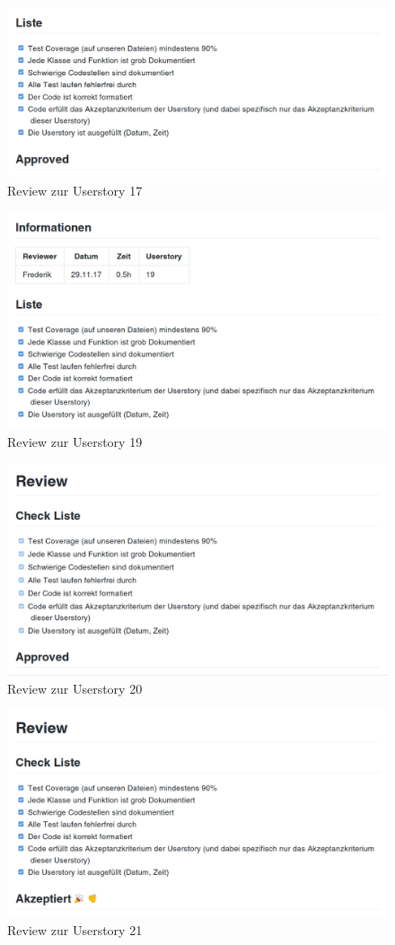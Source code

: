\documentclass[accentcolor=tud9c,12pt,paper=a4]{tudreport}
\begin{document}
\begin{figure}[H]
\centering
\includegraphics[width=.8\textwidth]{code_review/us17}
\caption{Review zur Userstory 17}
\end{figure}

\begin{figure}[H]
\centering
\includegraphics[width=.8\textwidth]{code_review/us19}
\caption{Review zur Userstory 19}
\end{figure}

\begin{figure}[H]
\centering
\includegraphics[width=.8\textwidth]{code_review/us20}
\caption{Review zur Userstory 20}
\end{figure}

\begin{figure}[H]
\centering
\includegraphics[width=.8\textwidth]{code_review/us21}
\caption{Review zur Userstory 21}
\end{figure}
\end{document}
